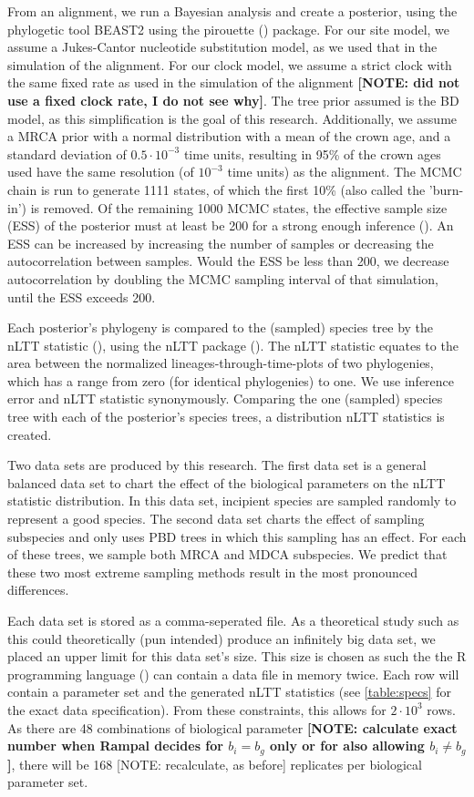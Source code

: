 \documentclass{article}
\begin{document}
From an alignment, we run a Bayesian analysis and create a posterior, 
using the phylogetic tool BEAST2 \cite{beast2} using the 
pirouette (\cite{pirouette}) package. For our site model, we assume a Jukes-Cantor 
nucleotide substitution model, as we used that in the simulation of the alignment.
For our clock model, we assume a strict clock with the same fixed rate as 
used in the simulation of the alignment \textbf{[NOTE: \cite{moller2018} did not use a
fixed clock rate, I do not see why]}. The tree prior assumed is the BD model, 
as this simplification is the goal of this research. 
Additionally, we assume a MRCA prior with a normal distribution
with a mean of the crown age, and a standard deviation of $0.5 \cdot 10^{-3}$ time units,
resulting in 95\% of the crown ages used have the same resolution (of $10^{-3}$ time 
units) as the alignment. The MCMC chain is run to generate 1111 states,
of which the first 10\% (also called the 'burn-in') is removed. Of the remaining
1000 MCMC states, the effective sample size (ESS) of the posterior must at least be 200
for a strong enough inference (\cite{beastbook}). An ESS can be increased by increasing
the number of samples or decreasing the autocorrelation between samples. 
Would the ESS be less than 200, we decrease autocorrelation by doubling 
the MCMC sampling interval of that simulation, until the ESS exceeds 200.

Each posterior's phylogeny is compared to the (sampled) species tree
by the nLTT statistic (\cite{janzen2015}), using the nLTT package (\cite{nltt}). 
The nLTT statistic equates to the area between the normalized
lineages-through-time-plots of two phylogenies, which has a range 
from zero (for identical phylogenies) to one. We use inference error 
and nLTT statistic synonymously. Comparing the one (sampled) species tree
with each of the posterior's species trees, a distribution nLTT statistics
is created. 

Two data sets are produced by this research.
The first data set is a general balanced data set to chart
the effect of the biological parameters on the nLTT statistic
distribution. In this data set, incipient species are sampled 
randomly to represent a good species.
The second data set charts the effect of sampling
subspecies and only uses PBD trees in which this sampling
has an effect. For each of these trees, we sample both MRCA and
MDCA subspecies. We predict that these two most extreme sampling methods
result in the most pronounced differences.

Each data set is stored as a comma-seperated file. 
As a theoretical study such as this could theoretically (pun intended)
produce an infinitely big data set, we placed an upper limit 
for this data set's size. This size is chosen as such the 
the R programming language (\cite{r}) can contain a data file in
memory twice. Each row will contain a parameter set and the generated nLTT 
statistics (see \ref{table:specs} for the exact data specification).
From these constraints, this allows for $2 \cdot 10^3$ rows. As there are 48 combinations
of biological parameter \textbf{[NOTE: calculate exact number when Rampal decides
for $b_i = b_g$ only or for also allowing $b_i \neq b_g$]}, there will be 
168 {[NOTE: recalculate, as before]} replicates per biological parameter set.
\end{document}

